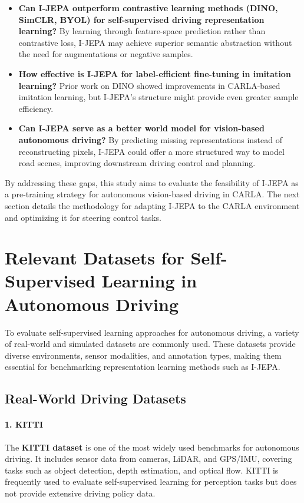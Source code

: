 \documentclass{article}
\begin{document}
\begin{itemize}
    \item \textbf{Can I-JEPA outperform contrastive learning methods (DINO, SimCLR, BYOL) for self-supervised driving representation learning?} By learning through feature-space prediction rather than contrastive loss, I-JEPA may achieve superior semantic abstraction without the need for augmentations or negative samples.
    \item \textbf{How effective is I-JEPA for label-efficient fine-tuning in imitation learning?} Prior work on DINO showed improvements in CARLA-based imitation learning, but I-JEPA’s structure might provide even greater sample efficiency.
    \item \textbf{Can I-JEPA serve as a better world model for vision-based autonomous driving?} By predicting missing representations instead of reconstructing pixels, I-JEPA could offer a more structured way to model road scenes, improving downstream driving control and planning.
\end{itemize}

By addressing these gaps, this study aims to evaluate the feasibility of I-JEPA as a pre-training strategy for autonomous vision-based driving in CARLA. The next section details the methodology for adapting I-JEPA to the CARLA environment and optimizing it for steering control tasks.

\section{Relevant Datasets for Self-Supervised Learning in Autonomous Driving}

To evaluate self-supervised learning approaches for autonomous driving, a variety of real-world and simulated datasets are commonly used. These datasets provide diverse environments, sensor modalities, and annotation types, making them essential for benchmarking representation learning methods such as I-JEPA.

\subsection{Real-World Driving Datasets}

\paragraph{1. KITTI} 
The \textbf{KITTI dataset} \citep{geiger2013vision} is one of the most widely used benchmarks for autonomous driving. It includes sensor data from cameras, LiDAR, and GPS/IMU, covering tasks such as object detection, depth estimation, and optical flow. KITTI is frequently used to evaluate self-supervised learning for perception tasks but does not provide extensive driving policy data.
\end{document}
